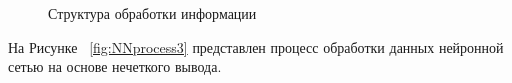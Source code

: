 \begin{figure}[ht]
    \caption{Структура обработки информации}\label{fig:NNprocess2}
\end{figure}
На Рисунке ~\cref{fig:NNprocess3} представлен процесс обработки данных нейронной сетью на основе нечеткого вывода. 
